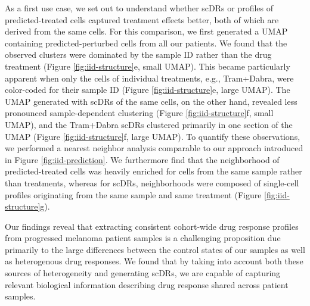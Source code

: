 As a first use case, we set out to understand whether scDRs or profiles of predicted-treated cells captured treatment effects better, both of which are derived from the same cells.
 For this comparison, we first generated a UMAP containing predicted-perturbed cells from all our patients.
 We found that the observed clusters were dominated by the sample ID rather than the drug treatment (Figure \ref{fig:iid-structure}e, small UMAP).
 This became particularly apparent when only the cells of individual treatments, e.g., Tram+Dabra, were color-coded for their sample ID (Figure \ref{fig:iid-structure}e, large UMAP).
 The UMAP generated with scDRs of the same cells, on the other hand, revealed less pronounced sample-dependent clustering (Figure \ref{fig:iid-structure}f, small UMAP), and the Tram+Dabra scDRs clustered primarily in one section of the UMAP (Figure \ref{fig:iid-structure}f, large UMAP).
 To quantify these observations, we performed a nearest neighbor analysis comparable to our approach introduced in Figure \ref{fig:iid-prediction}.
We furthermore find that the neighborhood of predicted-treated cells was heavily enriched for cells from the same sample rather than treatments, whereas for scDRs, neighborhoods were composed of single-cell profiles originating from the same sample and same treatment (Figure \ref{fig:iid-structure}g).

Our findings reveal that extracting consistent cohort-wide drug response profiles from progressed melanoma patient samples is a challenging proposition due primarily to the large differences between the control states of our samples as well as heterogenous drug responses.
 We found that by taking into account both these sources of heterogeneity and generating scDRs, we are capable of capturing relevant biological information describing drug response shared across patient samples. 

